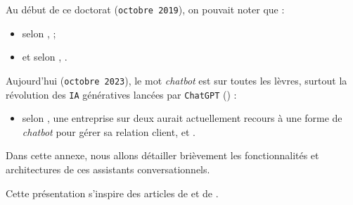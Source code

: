 \label{annex:B-ANNEXE-CHATBOT}
	
	
	Au début de ce doctorat (\texttt{octobre 2019}), on pouvait noter que :
	\begin{itemize}
		\item selon \cite{costello-lodolce:2019:gartner-top-technologies},  ;
		\item et selon \cite{goasduff:2019:chatbots-will-appeal}, .
	\end{itemize}
	
	Aujourd'hui (\texttt{octobre 2023}), le mot \textit{chatbot} est sur toutes les lèvres, surtout la révolution des \texttt{IA} génératives lancées par \texttt{ChatGPT} (\cite{openai:2023:chatgpt}) :
	\begin{itemize}
		\item selon \cite{costello-lodolce:2022:gartner-predicts-chatbots}, une entreprise sur deux aurait actuellement recours à une forme de \textit{chatbot}  pour gérer sa relation client, et .
	\end{itemize}

	Dans cette annexe, nous allons détailler brièvement les fonctionnalités et architectures de ces assistants conversationnels.
	
	\begin{leftBarInformation}
		Cette présentation s'inspire des articles de \cite{chen-etal:2017:survey-dialogue-systems} et de \cite{adamopoulou-moussiades:2020:overview-chatbot-technology}.
	\end{leftBarInformation}
	
	\minitoc
	
